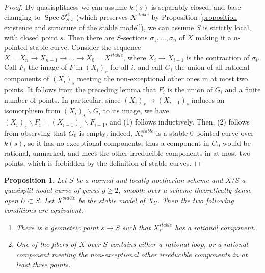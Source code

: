 \documentclass[a4paper,12pt]{amsart} %
\numberwithin{equation}{subsection}
\newcommand{\on}[1]{\operatorname{#1}}
\newcommand{\Spec}{\operatorname{Spec}}
\theoremstyle{definition}
\theoremstyle{plain}%
\newtheorem{proposition}[definition]{Proposition}
\theoremstyle{remark}
\renewcommand{\O}{\mathcal{O}}
\begin{document}
\begin{proof}
By quasisplitness we can assume $k(s)$ is separably closed, and base-changing to $\Spec\O_{S,s}^{\on{et}}$ (which preserves $X^{stable}$ by Proposition \ref{proposition existence and structure of the stable model}), we can assume $S$ is strictly local, with closed point $s$. Then there are $S$-sections $\sigma_1,...,\sigma_n$ of $X$ making it a $n$-pointed stable curve. Consider the sequence $X=X_n\to X_{n-1}\to...\to X_0=X^{stable}$, where $X_{i}\to X_{i-1}$ is the contraction of $\sigma_i$. Call $F_i$ the image of $F$ in $(X_i)_s$ for all $i$, and call $G_i$ the union of all rational components of $(X_i)_s$ meeting the non-exceptional other ones in at most two points. It follows from the preceding lemma that $F_i$ is the union of $G_i$ and a finite number of points. In particular, since $(X_i)_s\to (X_{i-1})_s$ induces an isomorphism from $(X_i)_s\backslash G_i$ to its image, we have $(X_i)_s\backslash F_i=(X_{i-1})_s\backslash F_{i-1}$, and (1) follows inductively. Then, (2) follows from observing that $G_0$ is empty: indeed, $X^{stable}_s$ is a stable $0$-pointed curve over $k(s)$, so it has no exceptional components, thus a component in $G_0$ would be rational, unmarked, and meet the other irreducible components in at most two points, which is forbidden by the definition of stable curves.
\end{proof}


\begin{proposition}\label{proposition the stable model has no rational components}
Let $S$ be a normal and locally noetherian scheme and $X/S$ a quasisplit nodal curve of genus $g\geq 2$, smooth over a scheme-theoretically dense open $U\subset S$. Let $X^{stable}$ be the stable model of $X_U$. Then the two following conditions are equivalent:
\begin{enumerate}
\item There is a geometric point $s\to S$ such that $X^{stable}_s$ has a rational component.
\item One of the fibers of $X$ over $S$ contains either a rational loop, or a rational component meeting the non-exceptional other irreducible components in at least three points.
\end{enumerate}

\end{proposition}
\end{document}
